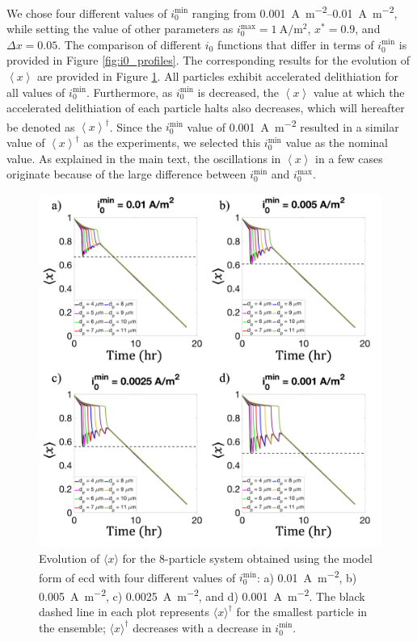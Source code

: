\documentclass{article}
\begin{document}
We chose four different values of $i_0^{\mathrm{min}}$ ranging from
\SIrange{0.001}{0.01}{\ampere\per\meter\squared}, while setting the
value of other parameters as
$i_0^{\mathrm{max}}=\SI{1}{\ampere\per\meter\squared}$, $x^{\ast
}=0.9$, and $\Delta x=0.05$. The comparison of different $i_0$
functions that differ in terms of $i_0^{\mathrm{min}}$ is provided in
Figure \ref{fig:i0_profiles}. The corresponding results for the
evolution of $\left\langle x\right\rangle $ are provided in Figure
\ref{fig:i0-sensitivity}. All particles exhibit accelerated
delithiation for all values of $i_0^{\mathrm{min}}$. Furthermore, as
$i_0^{\mathrm{min}}$ is decreased, the $\left\langle x\right\rangle $
value at which the accelerated delithiation of each particle halts
also decreases, which will hereafter be denoted as $\left\langle
x\right\rangle^\dag$. Since the $i_0^{\mathrm{min}}$ value of
\SI{0.001}{\ampere\per\meter\squared} resulted in a similar value of
$\left\langle x\right\rangle^\dag$ as the experiments, we selected
this $i_0^{\mathrm{min}}$ value as the nominal value. As explained in
the main text, the oscillations in $\left\langle x\right\rangle $ in a
few cases originate because of the large difference between
$i_0^{\mathrm{min}}$ and $i_0^{\mathrm{max}}$.

\begin{figure}
  \centering
  \includegraphics[width=6.5in]{8-particle-evolution-i0min.png}
  \caption{Evolution of $\langle x \rangle$ for the 8-particle system obtained using
    the model form of \gls{ecd} with four different values of
    $i_0^{\mathrm{min}}$: a) \SI{0.01}{\ampere\per\meter\squared}, b)
    \SI{0.005}{\ampere\per\meter\squared}, c)
    \SI{0.0025}{\ampere\per\meter\squared}, and d)
    \SI{0.001}{\ampere\per\meter\squared}. The black dashed line in
    each plot represents $\langle x \rangle^\dag$ for the smallest particle in the
    ensemble; $\langle x \rangle^\dag$ decreases with a decrease in $i_0^{\mathrm{min}}$.}
  \label{fig:i0-sensitivity}
\end{figure}
\end{document}
